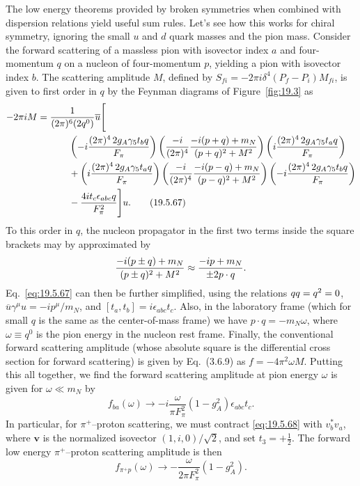 The low energy theorems provided by broken symmetries when combined with dispersion relations yield useful sum rules. Let's see how this works for chiral symmetry, ignoring the small $u$ and $d$ quark masses and the pion mass. Consider the forward scattering of a massless pion with isovector index $a$ and four-momentum $q$ on a nucleon of four-momentum $p$, yielding a pion with isovector index $b$. The scattering amplitude $M$, defined by $S_{fi}=-2\pi i\delta^4(P_f-P_i)M_{fi}$, is given to first order in $q$ by the Feynman diagrams of Figure~\ref{fig:19.3} as
\begin{align}
-2\pi iM
={}&\frac{1}{(2\pi)^6(2q^0)}
\overline u\Bigg[
\notag\\
&\qquad
\left(-i\frac{(2\pi)^4\,2g_A\gamma_5t_b\sl{q}}{F_\pi}\right)
\left(\frac{-i}{(2\pi)^4}
\frac{-i(\sl{p}+\sl{q})+m_N}{(p+q)^2+M^2}\right)
\left(i\frac{(2\pi)^4\,2g_A\gamma_5t_a\sl{q}}{F_\pi}\right)
\notag\\
&\qquad+
\left(i\frac{(2\pi)^4\,2g_A\gamma_5t_a\sl{q}}{F_\pi}\right)
\left(\frac{-i}{(2\pi)^4}
\frac{-i(\sl{p}-\sl{q})+m_N}{(p-q)^2+M^2}\right)
\left(-i\frac{(2\pi)^4\,2g_A\gamma_5t_b\sl{q}}{F_\pi}\right)
\notag\\
&\qquad-\frac{4it_c\epsilon_{abc}\sl{q}}{F_\pi^2}
\Bigg]u.
\tag{19.5.67}\label{eq:19.5.67}
\end{align}
To this order in $q$, the nucleon propagator in the first two terms inside the square brackets may by approximated by
\[
\frac{-i(\sl{p}\mathbin{\pm}\sl{q})+m_N}
{(p\mathbin{\pm}q)^2+M^2}
\approx
\frac{-i\sl{p}+m_N}{\mathbin{\pm}2p\cdot q}.
\]
Eq.~\eqref{eq:19.5.67} can then be further simplified, using the relations $\sl{q}\sl{q}=q^2=0$, $\overline u\gamma^\mu u=-ip^\mu/m_N$, and $[t_a,t_b]=i\epsilon_{abc}t_c$. Also, in the laboratory frame (which for small $q$ is the same as the center-of-mass frame) we have $p\cdot q=-m_N\omega$, where $\omega\equiv q^0$ is the pion energy in the nucleon rest frame. Finally, the conventional forward scattering amplitude (whose absolute square is the differential cross section for forward scattering) is given by Eq.~(3.6.9) as $f=-4\pi^2\omega M$. Putting this all together, we find the forward scattering amplitude at pion energy $\omega$ is given for $\omega\ll m_N$ by
\begin{equation}
f_{ba}(\omega)
\longrightarrow
-i\frac{\omega}{\pi F_\pi^2}(1-g_A^2)\epsilon_{abc}t_c.
\tag{19.5.68}\label{eq:19.5.68}
\end{equation}
In particular, for $\pi^+$--proton scattering, we must contract \eqref{eq:19.5.68} with $v_b^*v_a$, where $\boldsymbol v$ is the normalized isovector $(1,i,0)/\sqrt{2}$, and set $t_3=+\tfrac12$. The forward low energy $\pi^+$--proton scattering amplitude is then
\begin{equation}
f_{\pi^+p}(\omega)
\longrightarrow
-\frac{\omega}{2\pi F_\pi^2}(1-g_A^2).
\tag{19.5.69}\label{eq:19.5.69}
\end{equation}

